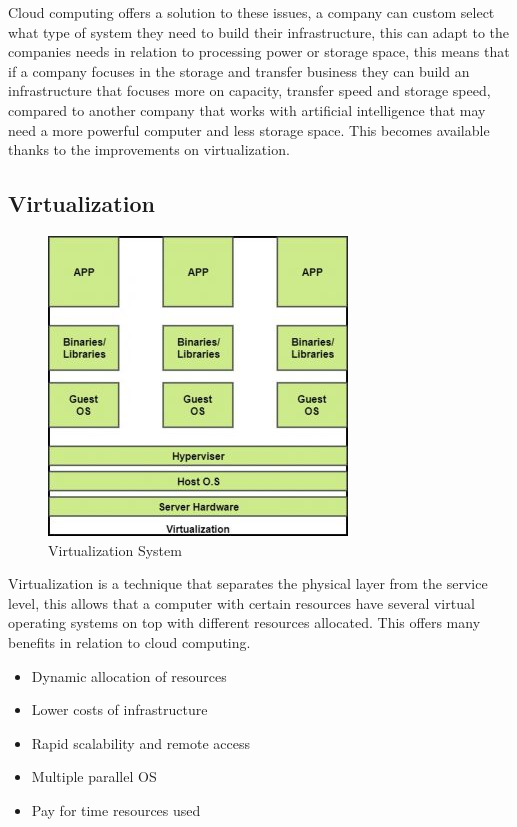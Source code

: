 Cloud computing offers a solution to these issues, a company can custom select what type of system they need to build their infrastructure, this can adapt to the companies needs in relation to processing power or storage space, this means that if a company focuses in the storage and transfer business they can build an infrastructure that focuses more on capacity, transfer speed and storage speed, compared to another company that works with artificial intelligence that may need a more powerful computer and less storage  space. This becomes available thanks to the improvements on virtualization.

\subsection{Virtualization}\label{sec:chap3_vir}

\begin{center}
	\begin{figure}[h!]
		\centering
		\includegraphics[scale=1]{./images/3-cloud-vir}
		\caption{Virtualization System}
		\label{cloud_vir}
	\end{figure}
\end{center}

Virtualization is a technique that separates the physical layer from the service level, this allows that a computer with certain resources have several virtual operating systems on top with different resources allocated. This offers many benefits in relation to cloud computing.

\begin{itemize}
	\item{Dynamic allocation of resources}
	\item{Lower costs of infrastructure}
	\item{Rapid scalability and remote access}
	\item{Multiple parallel OS}
	\item{Pay for time resources used}
\end{itemize}

